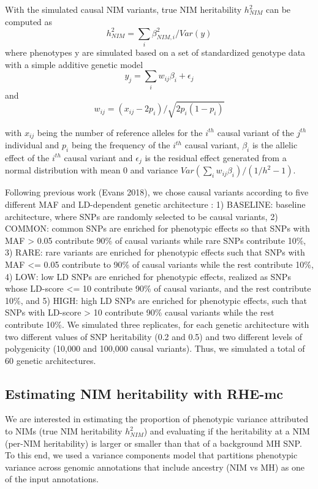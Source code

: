 With the simulated causal NIM variants, true NIM heritability $h^2_{NIM}$ can be computed as
$$h^2_{NIM} = \sum_{i}\beta^2_{NIM,i}/Var(y) $$
where phenotypes y are simulated based on a set of standardized genotype data with a simple additive genetic model
$$y_j = \sum_{i} w_{ij}\beta_i + \epsilon_j $$
and 
$$w_{ij} = (x_{ij} - 2p_i)/\sqrt{2p_i(1 - p_i)}$$

with $x_{ij}$ being the number of reference alleles for the $i^{th}$ causal variant of the $j^{th}$ individual and $p_i$ being the frequency of the $i^{th}$ causal variant, $\beta_i$ is the allelic effect of the $i^{th}$ causal variant and $\epsilon_j$ is the residual effect generated from a normal distribution with mean 0 and variance $Var(\sum_i w_{ij}\beta_i)/(1/h^2-1)$. 

Following previous work (Evans 2018), we chose causal variants according to five different MAF and LD-dependent genetic architecture : 1) BASELINE: baseline architecture, where SNPs are randomly selected to be causal variants, 2) COMMON: common SNPs are enriched for phenotypic effects so that SNPs with MAF > 0.05 contribute 90\% of causal variants while rare SNPs contribute 10\%, 3) RARE: rare variants are enriched for phenotypic effects such that SNPs with MAF <= 0.05 contribute to 90\% of causal variants while the rest contribute 10\%, 4) LOW: low LD SNPs are enriched for phenotypic effects, realized as SNPs whose LD-score <= 10 contribute 90\% of causal variants, and the rest contribute 10\%, and 5) HIGH: high LD SNPs are enriched for phenotypic effects, such that SNPs with LD-score > 10 contribute 90\% causal variants while the rest contribute 10\%. We simulated three replicates, for each genetic architecture with two different values of SNP heritability (0.2 and 0.5) and two different levels of polygenicity (10,000 and 100,000 causal variants). Thus, we simulated a total of 60 genetic architectures.

\subsection{Estimating NIM heritability with RHE-mc}
We are interested in estimating the proportion of phenotypic variance attributed to NIMs (true NIM heritability $h^2_{NIM}$) and evaluating if the heritability at a NIM (per-NIM heritability) is larger or smaller than that of a background MH SNP. To this end, we used a variance components model that partitions phenotypic variance across genomic annotations that include ancestry (NIM vs MH) as one of the input annotations.

